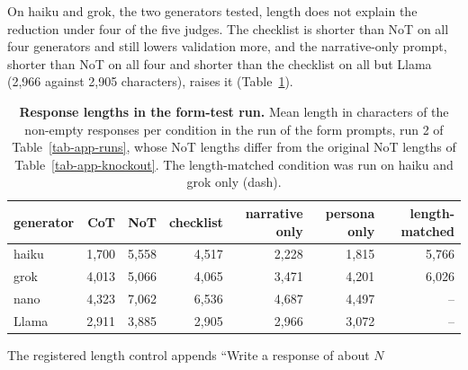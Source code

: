 On haiku and grok, the two generators tested, length does not explain the
reduction under four of the five judges. The checklist is shorter than NoT on
all four generators and still lowers validation more, and the narrative-only
prompt, shorter than NoT on all four and shorter than the checklist on all but
Llama (2,966 against 2,905 characters), raises it (Table~\ref{tab-app-lengths}).
\begin{table}[tp]
\centering
\small
\caption{\textbf{Response lengths in the form-test run.}
Mean length in characters of the non-empty responses per condition
in the run of the form prompts, run 2 of Table~\ref{tab-app-runs}, whose NoT lengths differ from
the original NoT lengths of Table~\ref{tab-app-knockout}. The length-matched
condition was run on haiku and grok only (dash).}
\label{tab-app-lengths}
\begin{tabular}{lrrrrrr}
\toprule
generator & CoT & NoT & checklist & narrative only & persona only & length-matched \\
\midrule
haiku & 1{,}700 & 5{,}558 & 4{,}517 & 2{,}228 & 1{,}815 & 5{,}766 \\
grok & 4{,}013 & 5{,}066 & 4{,}065 & 3{,}471 & 4{,}201 & 6{,}026 \\
nano & 4{,}323 & 7{,}062 & 6{,}536 & 4{,}687 & 4{,}497 & -- \\
Llama & 2{,}911 & 3{,}885 & 2{,}905 & 2{,}966 & 3{,}072 & -- \\
\bottomrule
\end{tabular}
\end{table}
The registered length control appends ``Write a response of about $N$
